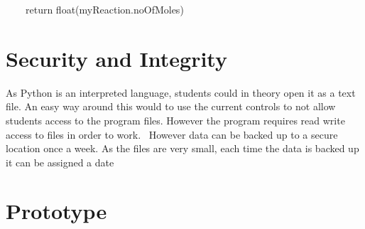 \documentclass[a4paper,12pt]{report}
\begin{document}
\ \ \ \ return float(myReaction.noOfMoles)


\bigskip


\bigskip


\bigskip

\section{Security and Integrity}


\bigskip

As Python is an interpreted language, students could in theory open it as a text file. An easy way around this would to use the current controls to not allow students access to the program files. However the program requires read write access to files in order to work. \ However data can be backed up to a secure location once a week. As the files are very small, each time the data is backed up it can be assigned a date


\bigskip


\bigskip


\bigskip

\section{Prototype}


\bigskip
\end{document}
